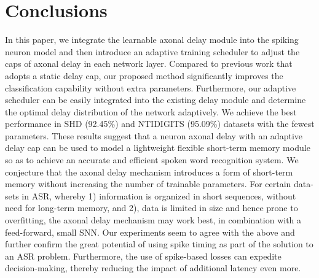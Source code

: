 \documentclass{article}
\begin{document}
\section{Conclusions}\label{5}
In this paper, we integrate the learnable axonal delay module into the spiking neuron model and then introduce an adaptive training scheduler to adjust the caps of axonal delay in each network layer.  Compared to previous work that adopts a static delay cap, our proposed method significantly improves the classification capability without extra parameters. Furthermore, our adaptive scheduler can be easily integrated into the existing delay module and determine the optimal delay distribution of the network adaptively. We achieve the best performance in SHD (92.45\%) and NTIDIGITS (95.09\%) datasets with the fewest parameters. These results suggest that a neuron axonal delay with an adaptive delay cap can be used to model a lightweight flexible short-term memory module so as to achieve an accurate and efficient spoken word recognition system. We conjecture that the axonal delay mechanism introduces a form of short-term memory without increasing the number of trainable parameters. For certain data-sets in ASR, whereby 1) information is organized in short sequences, without need for long-term memory, and 2), data is limited in size and hence prone to overfitting, the axonal delay mechanism may work best, in combination with a feed-forward, small SNN. Our experiments seem to agree with the above and further confirm the great potential of using spike timing as part of the solution to an ASR problem. Furthermore, the use of spike-based losses \cite{9892379} can expedite decision-making, thereby reducing the impact of additional latency even more.  \\
 



\footnotesize


\end{document}
